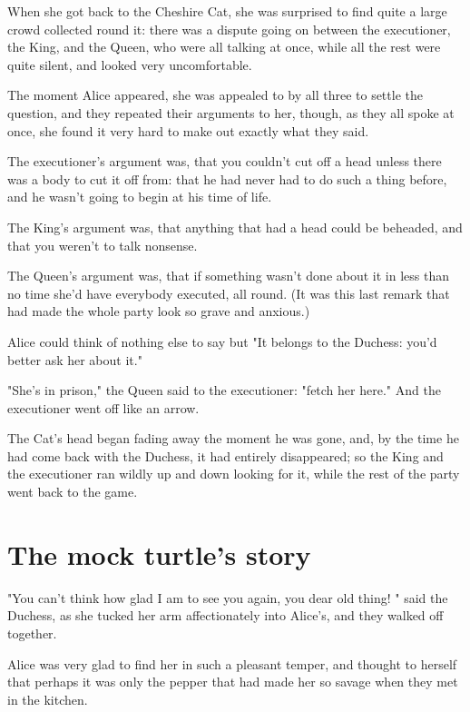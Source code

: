 When she got back to the Cheshire Cat, she was surprised to find quite a large crowd collected round it: there was a dispute going on between the executioner, the King, and the Queen, who were all talking at once, while all the rest were quite silent, and looked very uncomfortable.

The moment Alice appeared, she was appealed to by all three to settle the question, and they repeated their arguments to her, though, as they all spoke at once, she found it very hard to make out exactly what they said.

The executioner's argument was, that you couldn't cut off a head unless there was a body to cut it off from: that he had never had to do such a thing before, and he wasn't going to begin at his time of life.

The King's argument was, that anything that had a head could be beheaded, and that you weren't to talk nonsense.

The Queen's argument was, that if something wasn't done about it in less than no time she'd have everybody executed, all round. (It ​was this last remark that had made the whole party look so grave and anxious.)

Alice could think of nothing else to say but "It belongs to the Duchess: you'd better ask her about it."

"She's in prison," the Queen said to the executioner: "fetch her here." And the executioner went off like an arrow.

The Cat's head began fading away the moment he was gone, and, by the time he had come back with the Duchess, it had entirely disappeared; so the King and the executioner ran wildly up and down looking for it, while the rest of the party went back to the game.

\quebra\chapter*{The mock turtle's story}

"You can't think how glad I am to see you again, you dear old thing! " said the Duchess, as she tucked her arm affectionately into Alice's, and they walked off together.

Alice was very glad to find her in such a pleasant temper, and thought to herself that perhaps it was only the pepper that had made her so savage when they met in the kitchen.

